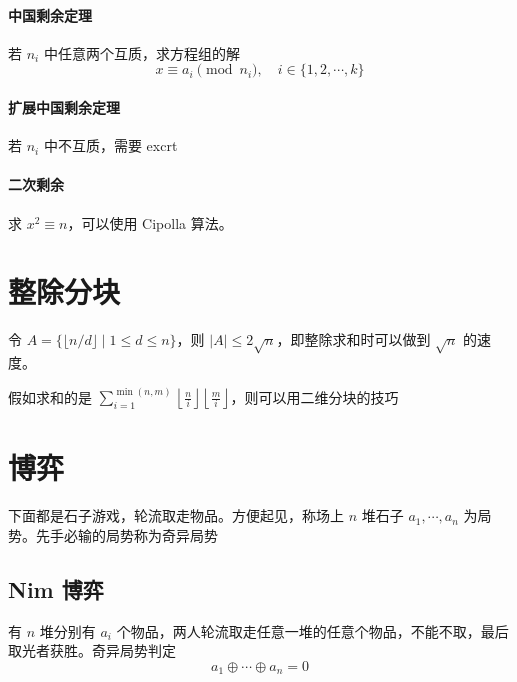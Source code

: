 \documentclass{probook}
\begin{document}
\begin{multicols}{2}
\paragraph{中国剩余定理}
若 $n_i$ 中任意两个互质，求方程组的解
\[ x \equiv a_i \pmod {n_i} , \quad i \in \{ 1,2,\cdots,k \} \]



\paragraph{扩展中国剩余定理}
若 $n_i$ 中不互质，需要 excrt


\paragraph{二次剩余} 求 $x^2 \equiv n$，可以使用 Cipolla 算法。



\section{整除分块}
令 $A = \{ \lfloor n/d \rfloor \mid 1 \leqslant d \leqslant n \}$，则 $|A| \leqslant 2\sqrt{n}$，即整除求和时可以做到 $\sqrt{n}$ 的速度。



假如求和的是 $\sum\limits_{i=1}^{\min(n,m)} \left\lfloor \frac{n}{i} \right\rfloor\left\lfloor \frac{m}{i} \right\rfloor$，则可以用二维分块的技巧




\section{博弈}

下面都是石子游戏，轮流取走物品。方便起见，称场上 $n$ 堆石子 $a_1,\cdots,a_n$ 为局势。先手必输的局势称为奇异局势

\subsection{Nim 博弈}

有 $n$ 堆分别有 $a_i$ 个物品，两人轮流取走任意一堆的任意个物品，不能不取，最后取光者获胜。奇异局势判定
\[a_1 \oplus \cdots \oplus a_n =0\]


\end{multicols}
\end{document}
